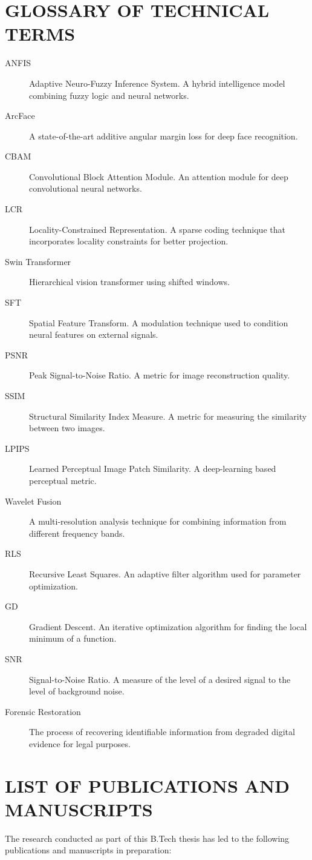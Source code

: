 \chapter{GLOSSARY OF TECHNICAL TERMS}
\begin{description}
    \item[ANFIS] Adaptive Neuro-Fuzzy Inference System. A hybrid intelligence model combining fuzzy logic and neural networks.
    \item[ArcFace] A state-of-the-art additive angular margin loss for deep face recognition.
    \item[CBAM] Convolutional Block Attention Module. An attention module for deep convolutional neural networks.
    \item[LCR] Locality-Constrained Representation. A sparse coding technique that incorporates locality constraints for better projection.
    \item[Swin Transformer] Hierarchical vision transformer using shifted windows.
    \item[SFT] Spatial Feature Transform. A modulation technique used to condition neural features on external signals.
    \item[PSNR] Peak Signal-to-Noise Ratio. A metric for image reconstruction quality.
    \item[SSIM] Structural Similarity Index Measure. A metric for measuring the similarity between two images.
    \item[LPIPS] Learned Perceptual Image Patch Similarity. A deep-learning based perceptual metric.
    \item[Wavelet Fusion] A multi-resolution analysis technique for combining information from different frequency bands.
    \item[RLS] Recursive Least Squares. An adaptive filter algorithm used for parameter optimization.
    \item[GD] Gradient Descent. An iterative optimization algorithm for finding the local minimum of a function.
    \item[SNR] Signal-to-Noise Ratio. A measure of the level of a desired signal to the level of background noise.
    \item[Forensic Restoration] The process of recovering identifiable information from degraded digital evidence for legal purposes.
\end{description}

\chapter{LIST OF PUBLICATIONS AND MANUSCRIPTS}
The research conducted as part of this B.Tech thesis has led to the following publications and manuscripts in preparation:

